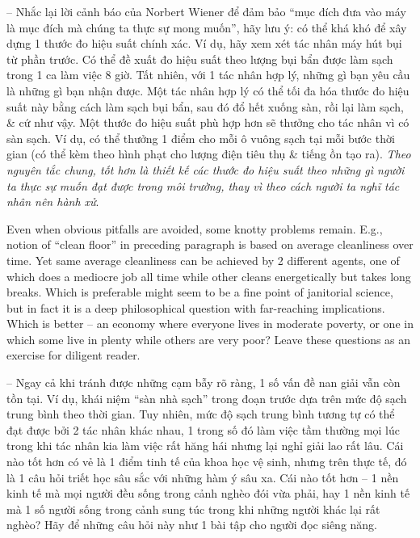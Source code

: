 \documentclass{article}
\begin{document}
\begin{itemize}
\begin{itemize}
\begin{itemize}
\begin{itemize}
				-- Nhắc lại lời cảnh báo của {\sc Norbert Wiener} để đảm bảo ``mục đích đưa vào máy là mục đích mà chúng ta thực sự mong muốn'', hãy lưu ý: có thể khá khó để xây dựng 1 thước đo hiệu suất chính xác. Ví dụ, hãy xem xét tác nhân máy hút bụi từ phần trước. Có thể đề xuất đo hiệu suất theo lượng bụi bẩn được làm sạch trong 1 ca làm việc 8 giờ. Tất nhiên, với 1 tác nhân hợp lý, những gì bạn yêu cầu là những gì bạn nhận được. Một tác nhân hợp lý có thể tối đa hóa thước đo hiệu suất này bằng cách làm sạch bụi bẩn, sau đó đổ hết xuống sàn, rồi lại làm sạch, \& cứ như vậy. Một thước đo hiệu suất phù hợp hơn sẽ thưởng cho tác nhân vì có sàn sạch. Ví dụ, có thể thưởng 1 điểm cho mỗi ô vuông sạch tại mỗi bước thời gian (có thể kèm theo hình phạt cho lượng điện tiêu thụ \& tiếng ồn tạo ra). {\it Theo nguyên tắc chung, tốt hơn là thiết kế các thước đo hiệu suất theo những gì người ta thực sự muốn đạt được trong môi trường, thay vì theo cách người ta nghĩ tác nhân nên hành xử}.
				
				Even when obvious pitfalls are avoided, some knotty problems remain. E.g., notion of ``clean floor'' in preceding paragraph is based on average cleanliness over time. Yet same average cleanliness can be achieved by 2 different agents, one of which does a mediocre job all time while other cleans energetically but takes long breaks. Which is preferable might seem to be a fine point of janitorial science, but in fact it is a deep philosophical question with far-reaching implications. Which is better -- an economy where everyone lives in moderate poverty, or one in which some live in plenty while others are very poor? Leave these questions as an exercise for diligent reader.
				
				-- Ngay cả khi tránh được những cạm bẫy rõ ràng, 1 số vấn đề nan giải vẫn còn tồn tại. Ví dụ, khái niệm ``sàn nhà sạch'' trong đoạn trước dựa trên mức độ sạch trung bình theo thời gian. Tuy nhiên, mức độ sạch trung bình tương tự có thể đạt được bởi 2 tác nhân khác nhau, 1 trong số đó làm việc tầm thường mọi lúc trong khi tác nhân kia làm việc rất hăng hái nhưng lại nghỉ giải lao rất lâu. Cái nào tốt hơn có vẻ là 1 điểm tinh tế của khoa học vệ sinh, nhưng trên thực tế, đó là 1 câu hỏi triết học sâu sắc với những hàm ý sâu xa. Cái nào tốt hơn -- 1 nền kinh tế mà mọi người đều sống trong cảnh nghèo đói vừa phải, hay 1 nền kinh tế mà 1 số người sống trong cảnh sung túc trong khi những người khác lại rất nghèo? Hãy để những câu hỏi này như 1 bài tập cho người đọc siêng năng.
				

\end{itemize}
\end{itemize}
\end{itemize}
\end{itemize}
\end{document}
